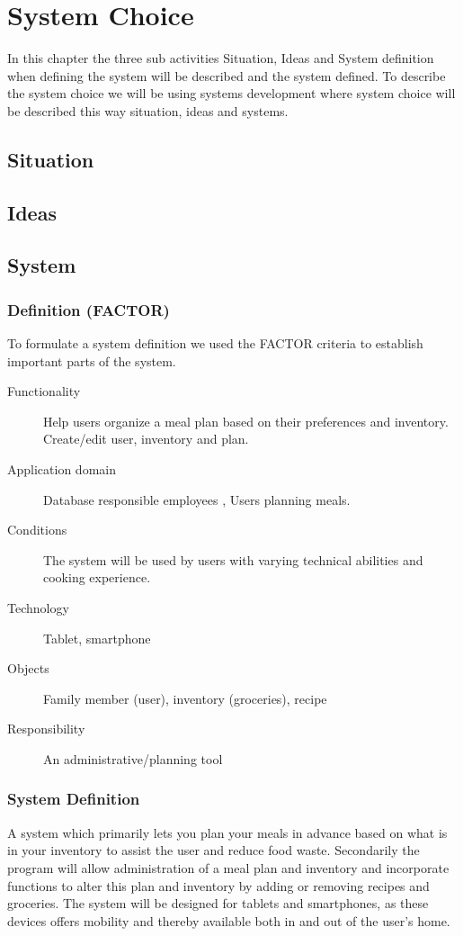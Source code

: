 \chapter{System Choice}
In this chapter the three sub activities Situation, Ideas and System definition when defining the system will be described and the system defined.
To describe the system choice we will be using systems development where system choice will be described this way situation, ideas and systems.

\section{Situation}


\section{Ideas}


\section{System}
\subsection{Definition (FACTOR)}
To formulate a system definition we used the FACTOR \cite{OOAD_BATOF} criteria to establish important parts of the system.

\begin{description}
	\item[Functionality] Help users organize a meal plan based on their preferences and inventory. Create/edit user, inventory and plan.
	\item[Application domain] Database responsible employees , Users planning meals.
	\item[Conditions] The system will be used by users with varying technical abilities and cooking experience.
	\item[Technology] Tablet, smartphone
	\item[Objects] Family member (user), inventory (groceries), recipe
	\item[Responsibility] An administrative/planning tool
\end{description}

\subsection{System Definition}
A system which primarily lets you plan your meals in advance based on what is in your inventory to assist the user and reduce food waste.
Secondarily the program will allow administration of a meal plan and inventory and incorporate functions to alter this plan and inventory by adding or removing recipes and groceries.
The system will be designed for tablets and smartphones, as these devices offers mobility and thereby available both in and out of the user's home.